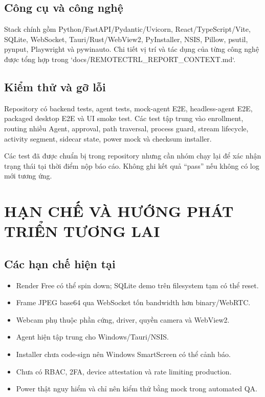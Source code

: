 \documentclass[12pt,a4paper]{article}
\begin{document}
\subsection{Công cụ và công nghệ}

Stack chính gồm Python/FastAPI/Pydantic/Uvicorn, React/TypeScript/Vite, SQLite, WebSocket, Tauri/Rust/WebView2, PyInstaller, NSIS, Pillow, psutil, pynput, Playwright và pywinauto. Chi tiết vị trí và tác dụng của từng công nghệ được tổng hợp trong `docs/REMOTECTRL_REPORT_CONTEXT.md`.

\subsection{Kiểm thử và gỡ lỗi}

Repository có backend tests, agent tests, mock-agent E2E, headless-agent E2E, packaged desktop E2E và UI smoke test. Các test tập trung vào enrollment, routing nhiều Agent, approval, path traversal, process guard, stream lifecycle, activity segment, sidecar state, power mock và checksum installer.

Các test đã được chuẩn bị trong repository nhưng cần nhóm chạy lại để xác nhận trạng thái tại thời điểm nộp báo cáo. Không ghi kết quả ``pass'' nếu không có log mới tương ứng.

\section{HẠN CHẾ VÀ HƯỚNG PHÁT TRIỂN TƯƠNG LAI}

\subsection{Các hạn chế hiện tại}

\begin{itemize}[leftmargin=*]
    \item Render Free có thể spin down; SQLite demo trên filesystem tạm có thể reset.
    \item Frame JPEG base64 qua WebSocket tốn bandwidth hơn binary/WebRTC.
    \item Webcam phụ thuộc phần cứng, driver, quyền camera và WebView2.
    \item Agent hiện tập trung cho Windows/Tauri/NSIS.
    \item Installer chưa code-sign nên Windows SmartScreen có thể cảnh báo.
    \item Chưa có RBAC, 2FA, device attestation và rate limiting production.
    \item Power thật nguy hiểm và chỉ nên kiểm thử bằng mock trong automated QA.
\end{itemize}
\end{document}
